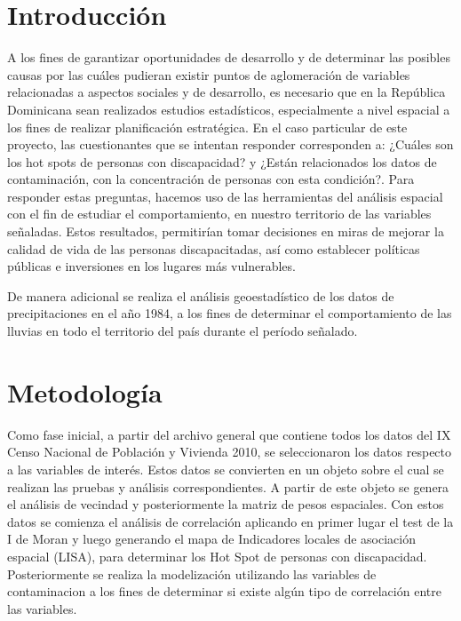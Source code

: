 \documentclass[11pt,]{article}
\begin{document}
\vskip 6.5pt


\noindent  \section{Introducción}\label{introducciuxf3n}

A los fines de garantizar oportunidades de desarrollo y de determinar
las posibles causas por las cuáles pudieran existir puntos de
aglomeración de variables relacionadas a aspectos sociales y de
desarrollo, es necesario que en la República Dominicana sean realizados
estudios estadísticos, especialmente a nivel espacial a los fines de
realizar planificación estratégica. En el caso particular de este
proyecto, las cuestionantes que se intentan responder corresponden a:
¿Cuáles son los hot spots de personas con discapacidad? y ¿Están
relacionados los datos de contaminación, con la concentración de
personas con esta condición?. Para responder estas preguntas, hacemos
uso de las herramientas del análisis espacial con el fin de estudiar el
comportamiento, en nuestro territorio de las variables señaladas. Estos
resultados, permitirían tomar decisiones en miras de mejorar la calidad
de vida de las personas discapacitadas, así como establecer políticas
públicas e inversiones en los lugares más vulnerables.

De manera adicional se realiza el análisis geoestadístico de los datos
de precipitaciones en el año 1984, a los fines de determinar el
comportamiento de las lluvias en todo el territorio del país durante el
período señalado.

\section{Metodología}\label{metodologuxeda}

Como fase inicial, a partir del archivo general que contiene todos los
datos del IX Censo Nacional de Población y Vivienda 2010, se
seleccionaron los datos respecto a las variables de interés. Estos datos
se convierten en un objeto sobre el cual se realizan las pruebas y
análisis correspondientes. A partir de este objeto se genera el análisis
de vecindad y posteriormente la matriz de pesos espaciales. Con estos
datos se comienza el análisis de correlación aplicando en primer lugar
el test de la I de Moran y luego generando el mapa de Indicadores
locales de asociación espacial (LISA), para determinar los Hot Spot de
personas con discapacidad. Posteriormente se realiza la modelización
utilizando las variables de contaminacion a los fines de determinar si
existe algún tipo de correlación entre las variables.
\end{document}

